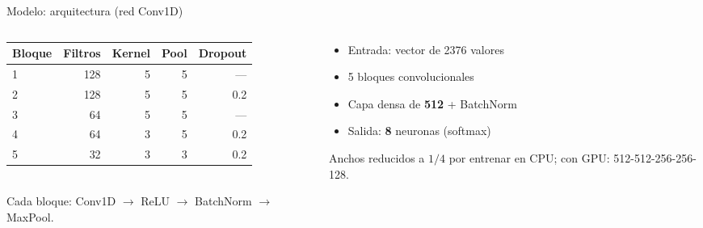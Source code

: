\documentclass[aspectratio=169,11pt]{beamer}
\newcommand{\nota}[1]{{\small\color{tinta2}#1}}
\begin{document}
\begin{frame}{Modelo: arquitectura (red Conv1D)}
  \begin{columns}[T]
    \begin{column}{0.58\textwidth}
      \centering
      \begin{tabular}{lrrrr}
        \toprule
        Bloque & Filtros & Kernel & Pool & Dropout \\
        \midrule
        1 & 128 & 5 & 5 & --- \\
        2 & 128 & 5 & 5 & 0.2 \\
        3 & 64 & 5 & 5 & --- \\
        4 & 64 & 3 & 5 & 0.2 \\
        5 & 32 & 3 & 3 & 0.2 \\
        \bottomrule
      \end{tabular}\\[0.5em]
      \nota{Cada bloque: Conv1D $\to$ ReLU $\to$ BatchNorm $\to$ MaxPool.}
    \end{column}
    \begin{column}{0.42\textwidth}
      \begin{itemize}
        \item Entrada: vector de 2376 valores
        \item 5 bloques convolucionales
        \item Capa densa de \textbf{512} + BatchNorm
        \item Salida: \textbf{8} neuronas (softmax)
      \end{itemize}
      \nota{Anchos reducidos a $1/4$ por entrenar en CPU; con GPU: 512-512-256-256-128.}
    \end{column}
  \end{columns}
\end{frame}
\end{document}
